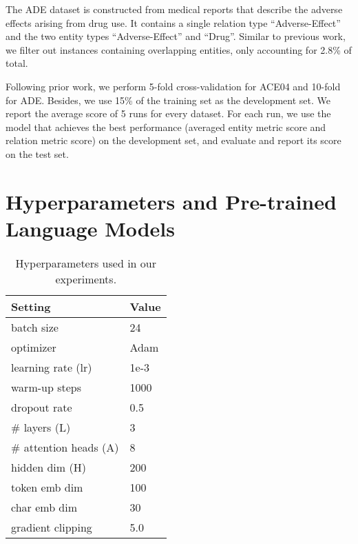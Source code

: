 \documentclass[11pt,a4paper]{article}
\begin{document}
The ADE dataset is constructed from medical reports that describe the
adverse effects arising from drug use. It contains a single relation
type ``Adverse-Effect'' and the two entity types ``Adverse-Effect'' and ``Drug''.
Similar to previous work, we filter out instances containing overlapping entities, only accounting for 2.8\% of total.

Following prior work, we perform 5-fold cross-validation for ACE04 and 10-fold for ADE.
Besides, we use 15\% of the training set as the development set.
We report the average score of 5 runs for every dataset.
For each run, we use the model that achieves the best performance (averaged entity metric score and relation metric score) on the development set, and evaluate and report its score on the test set.

\section{Hyperparameters and Pre-trained Language Models} \label{sec:training}

\begin{table}[]
    \centering
\scalebox{0.82}
    {
        \begin{tabular}{ll}
        \toprule
        Setting                     & Value          \\
        \midrule
        batch size                  & 24             \\
        optimizer                   & Adam           \\
        learning rate (lr)          & 1e-3           \\
        warm-up steps               & 1000           \\
        dropout rate                & 0.5             \\
        \# layers (L)               & 3               \\
        \# attention heads (A)      & 8              \\
        hidden dim (H)              & 200             \\
        token emb dim               & 100            \\
        char emb dim                & 30             \\
        gradient clipping           & 5.0            \\
        \bottomrule
        \end{tabular}
    }
    \caption{Hyperparameters used in our experiments. }
    \label{tab:hyperparameters}
\end{table}
\end{document}
